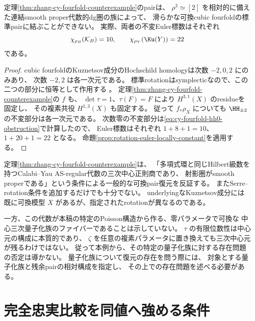 \begin{corollary}
\label{cor:zhang-cy-component-obstruction}
 定理\ref{thm:zhang-cy-fourfold-counterexample}のpairは、
 \(\rho^3\simeq[2]\) を相対的に備えた連結smooth proper代数的dg圏の族によって、
 滑らかな可換cubic fourfoldの標準pairに結ぶことができない。
 実際、両者の不変Euler標数はそれぞれ
 \[
 \chi_{\rho_B}(\mathcal K_B)=10,
 \qquad
 \chi_{\rho_Y}(\Ku(Y))=22
 \]
 である。
\end{corollary}
\begin{proof}
 cubic fourfoldのKuznetsov成分のHochschild homologyは次数 \(-2,0,2\) にのみあり、
 次数 \(-2,2\) は各一次元である。
 標準rotationはsymplecticなので、この二つの部分に恒等として作用する
 \cite[Proposition 3.12]{Huy}。
 定理\ref{thm:zhang-cy-fourfold-counterexample}の \(f\) も、
 \(\det\tau=1\)、\(\tau(F)=F\) により \(H^{3,1}(X)\) のresidueを固定し、
 その複素共役 \(H^{1,3}(X)\) も固定する。
 従って \(f_*\rho_X\) についても \(\HH_{\pm2}\) の不変部分は各一次元である。
 次数零の不変部分は\eqref{eq:cy-fourfold-hh0-obstruction}で計算したので、
 Euler標数はそれぞれ \(1+8+1=10\)、\(1+20+1=22\) となる。
 命題\ref{prop:rotation-euler-locally-constant}を適用する。
\end{proof}

\begin{remark}[量子化族との論理的関係]
\label{rem:counterexample-quantization-scope}
 定理\ref{thm:zhang-cy-fourfold-counterexample}は、
 「多項式環と同じHilbert級数を持つCalabi--Yau AS-regular代数の三次中心正則商であり、
 射影圏がsmooth properである」という条件による一般的な可換pair復元を反証する。
 またSerre--rotation条件を追加するだけでも十分でない。
 underlyingなKuznetsov成分には既に可換模型 \(X\) があるが、指定されたrotationが異なるのである。

 一方、この代数が本稿の特定のPoisson構造から作る、零パラメータで可換な
 中心三次量子化族のファイバーであることは示していない。
 \(\tau\) の有限位数性は中心元の構成に本質的であり、
 \(\zeta\) を任意の複素パラメータに置き換えても三次中心元が残るわけではない。
 従って本例から、その特定の量子化族に対する存在問題の否定は導かない。
 量子化族について復元の存在を問う際には、
 対象とする量子化族と残余pairの相対構成を指定し、
 その上での存在問題を述べる必要がある。
\end{remark}

\section{完全忠実比較を同値へ強める条件}
\label{sec:serre-generation}

